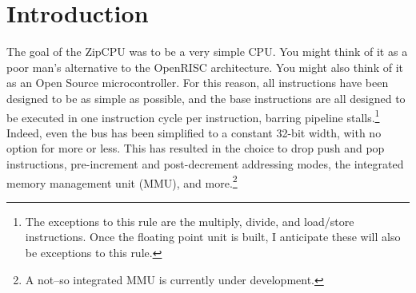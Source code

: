 \documentclass{gqtekspec}
\begin{document}
\chapter{Introduction}
\setcounter{page}{1}

The goal of the ZipCPU was to be a very simple CPU.   You might think of it as
a poor man's alternative to the OpenRISC architecture.  You might also think of
it as an Open Source microcontroller.
For this reason, all instructions have been designed to be as simple as
possible, and the base instructions are all designed to be executed in one
instruction cycle per instruction, barring pipeline stalls.\footnote{The
exceptions to this rule are the multiply, divide, and load/store instructions.
Once the floating point unit is built, I anticipate these will also be
exceptions to this rule.}  Indeed, even the bus has been simplified to a
constant 32-bit width, with no option for more or less.  This has resulted in
the choice to drop push and pop instructions, pre-increment and post-decrement
addressing modes, the integrated memory management unit (MMU), and
more.\footnote{A not--so integrated MMU is currently under development.}
\end{document}
